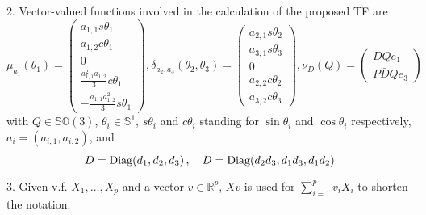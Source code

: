 \documentclass[a4paper,twoside]{article}
\def \RR {{\mathbb R}}
\def \UU {{\mathbb S}}
\def \SO {{\mathbb S}{\mathbb O}}
\newcommand{\tnm}[1]{\textnormal{#1}}
\begin{document}
2. Vector-valued functions involved in the calculation of the proposed TF are
\[
\mu_{a_1}(\theta_1)= 
\begin{pmatrix}
a_{1,1} s \theta_1 \\
a_{1,2} c \theta_1 \\
0 \\
\frac{a_{1,1}^2 a_{1,2}}{3} c \theta_1 \\
-\frac{a_{1,1} a_{1,2}^2}{3} s \theta_1 
\end{pmatrix} , 
\delta_{a_2,a_3}(\theta_2,\theta_3)= 
\begin{pmatrix}
a_{2,1} s \theta_2 \\
a_{3,1} s \theta_3 \\
0 \\
a_{2,2} c \theta_2 \\
a_{3,2} c \theta_3 
\end{pmatrix} ,
\nu_{D}(Q)= \begin{pmatrix}
D Q e_1 \\
P \bar D Q e_3 
\end{pmatrix} 
\]
with $Q \in \SO(3)$, $\theta_i \in \UU^1$, 
$s \theta_i$ and $c \theta_i$ standing for $\sin \theta_i$ and $\cos \theta_i$ respectively, 
$a_i=(a_{i,1},a_{i,2})$, and
\begin{equation}
\label{defdb}
D= \tnm{Diag}(d_1,d_2,d_3) \, , \quad 
\bar D=  \tnm{Diag}(d_2 d_3,d_1 d_3,d_1 d_2)
\end{equation}

3. Given v.f. $X_1, \ldots, X_p$ and a vector $v \in \RR^p$, $X v$ is used for 
$\sum_{i=1}^p v_i X_i$ to shorten the notation.
\end{document}
